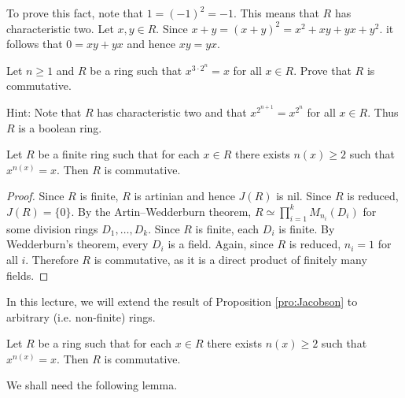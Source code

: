 To prove this fact, note that $1=(-1)^2=-1$. This means that $R$ has
characteristic two. Let $x,y\in R$. Since $x+y=(x+y)^2=x^2+xy+yx+y^2$. 
it follows that $0=xy+yx$ and hence $xy=yx$.

%

\begin{exercise}
\label{xca:x32^n=x}
Let $n\geq1$ and $R$ be a ring 
such that $x^{3\cdot 2^n}=x$ for all $x\in R$. 
Prove that $R$ is commutative. 
\end{exercise}

Hint: Note that $R$ has characteristic two and 
that 
$x^{2^{n+1}}=x^{2^n}$ for all $x\in R$. Thus 
$R$ is a boolean ring. 

\begin{proposition}
\label{pro:Jacobson}
    Let $R$ be a finite ring such that 
    for each $x\in R$ there exists $n(x)\geq2$ such that 
    $x^{n(x)}=x$. Then $R$ is commutative. 
\end{proposition}

\begin{proof}
    Since $R$ is finite, $R$ is artinian and hence $J(R)$ is nil. 
    Since $R$ is reduced, $J(R)=\{0\}$. 
    By the Artin--Wedderburn theorem, $R\simeq\prod_{i=1}^k M_{n_i}(D_i)$ for some division rings $D_1,\dots,D_k$. 
    Since $R$ is finite, each $D_i$ is finite. By Wedderburn's theorem,
    every $D_i$ is a field. Again, since $R$ is reduced, 
    $n_i=1$ for all $i$. Therefore $R$ is commutative, as it is 
    a direct product of finitely many fields.
\end{proof}

In this lecture, we will extend the 
result of 
Proposition \ref{pro:Jacobson} to arbitrary 
(i.e. non-finite) rings. 

\begin{theorem}[Jacobson]
\label{thm:commutativity}
	Let $R$ be a ring such that 
	for each $x\in R$ there exists $n(x)\geq2$ such that 
	$x^{n(x)}=x$. Then $R$ is commutative. 
\end{theorem}

We shall need the following lemma.


